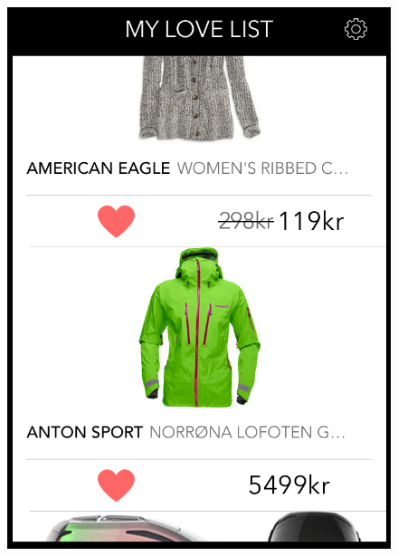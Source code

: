 \begin{figure}[H]
\begin{minipage}{.3\linewidth}
			  \includegraphics[height=1.5\linewidth]{image/SoBazaarlovelist.png}
			\end{minipage}
			\hspace{.02\linewidth}
			\begin{minipage}{.3\linewidth}

\end{minipage}
\end{figure}

